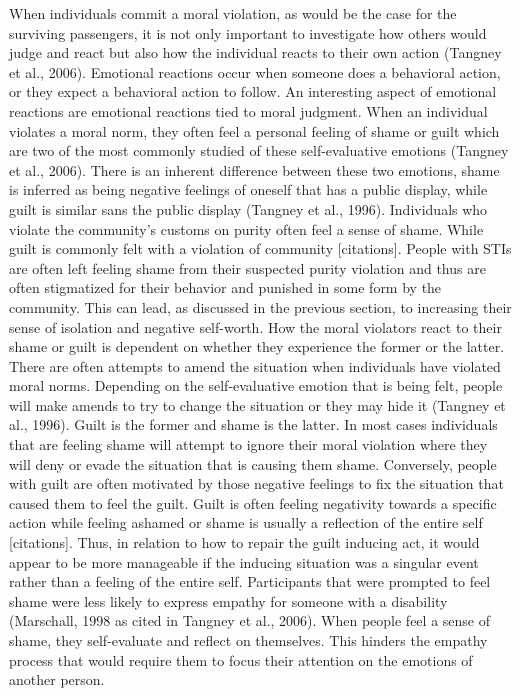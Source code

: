 \documentclass[
  english,
  donotrepeattitle,doc, 12pt, a4paper,floatsintext]{apa7}
\begin{document}
When individuals commit a moral violation, as would be the case for the surviving passengers, it is not only important to investigate how others would judge and react but also how the individual reacts to their own action (Tangney et al., 2006). Emotional reactions occur when someone does a behavioral action, or they expect a behavioral action to follow. An interesting aspect of emotional reactions are emotional reactions tied to moral judgment. When an individual violates a moral norm, they often feel a personal feeling of shame or guilt which are two of the most commonly studied of these self-evaluative emotions (Tangney et al., 2006). There is an inherent difference between these two emotions, shame is inferred as being negative feelings of oneself that has a public display, while guilt is similar sans the public display (Tangney et al., 1996). Individuals who violate the community's customs on purity often feel a sense of shame. While guilt is commonly felt with a violation of community {[}citations{]}. People with STIs are often left feeling shame from their suspected purity violation and thus are often stigmatized for their behavior and punished in some form by the community. This can lead, as discussed in the previous section, to increasing their sense of isolation and negative self-worth. How the moral violators react to their shame or guilt is dependent on whether they experience the former or the latter.
There are often attempts to amend the situation when individuals have violated moral norms. Depending on the self-evaluative emotion that is being felt, people will make amends to try to change the situation or they may hide it (Tangney et al., 1996). Guilt is the former and shame is the latter. In most cases individuals that are feeling shame will attempt to ignore their moral violation where they will deny or evade the situation that is causing them shame. Conversely, people with guilt are often motivated by those negative feelings to fix the situation that caused them to feel the guilt. Guilt is often feeling negativity towards a specific action while feeling ashamed or shame is usually a reflection of the entire self {[}citations{]}. Thus, in relation to how to repair the guilt inducing act, it would appear to be more manageable if the inducing situation was a singular event rather than a feeling of the entire self. Participants that were prompted to feel shame were less likely to express empathy for someone with a disability (Marschall, 1998 as cited in Tangney et al., 2006). When people feel a sense of shame, they self-evaluate and reflect on themselves. This hinders the empathy process that would require them to focus their attention on the emotions of another person.
\end{document}
